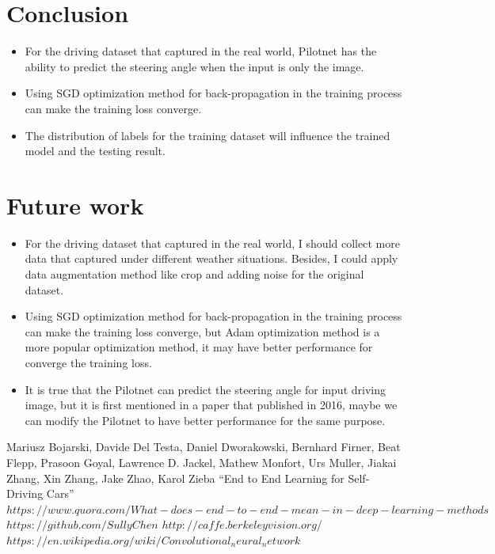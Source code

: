 \documentclass[conference]{IEEEtran}
\begin{document}
\section{Conclusion}
\begin{itemize}
	\item For the driving dataset that captured in the real world, Pilotnet has the ability to predict the steering angle when the input is only the image.
	\item Using SGD optimization method for back-propagation in the training process can make the training loss converge.
	\item The distribution of labels for the training dataset will influence the trained model and the testing result.
	
\end{itemize}

\section{Future work}
\begin{itemize}
	\item For the driving dataset that captured in the real world, I should collect more data that captured under different weather situations. Besides, I could apply data augmentation method like crop and adding noise for the original dataset.
	\item Using SGD optimization method for back-propagation in the training process can make the training loss converge, but Adam optimization method is a more popular optimization method, it may have better performance for converge the training loss.
	\item It is true that the Pilotnet can predict the steering angle for input driving image, but it is first mentioned in a paper that published in 2016, maybe we can modify the Pilotnet to have better performance for the same purpose.
	
\end{itemize}


\begin{thebibliography}{00}
 Mariusz Bojarski, Davide Del Testa, Daniel Dworakowski, Bernhard Firner, Beat Flepp, Prasoon Goyal, Lawrence D. Jackel, Mathew Monfort, Urs Muller, Jiakai Zhang, Xin Zhang, Jake Zhao, Karol Zieba  ``End to End Learning for Self-Driving Cars'' 
 $https://www.quora.com/What-does-end-to-end-mean-in-deep-learning-methods$
 $https://github.com/SullyChen$
 $http://caffe.berkeleyvision.org$/
 $https://en.wikipedia.org/wiki/Convolutional_neural_network$
\end{thebibliography}
\end{document}
